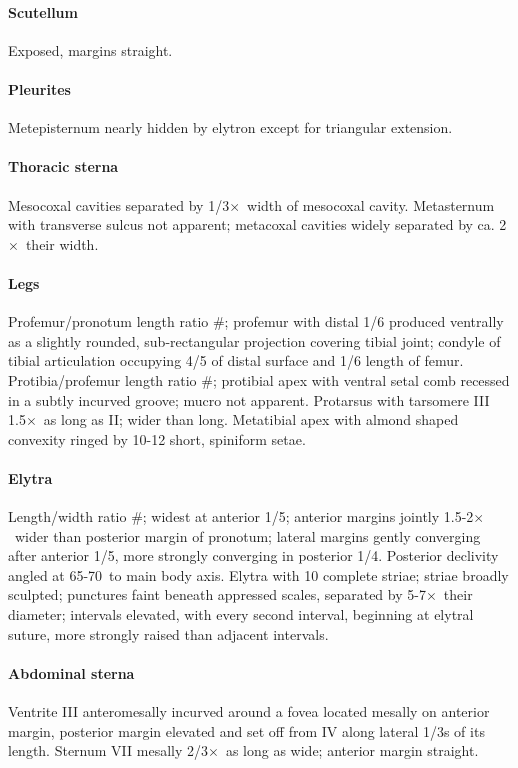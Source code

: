 \documentclass[fleqn,10pt,lineno]{wlpeerj} %
\newcommand{\td}{\textdegree~}
\newcommand{\x}{$\times$~}
\begin{document}
			\paragraph{Scutellum}
				Exposed, margins straight.
			\paragraph{Pleurites}
				Metepisternum nearly hidden by elytron except for triangular extension.
			\paragraph{Thoracic sterna} 
				Mesocoxal cavities separated by 1/3\x width of mesocoxal cavity. 
				Metasternum with transverse sulcus not apparent; metacoxal cavities widely separated by ca. 2\x their width.
			\paragraph{Legs}
				Profemur/pronotum length ratio \#; profemur with distal 1/6 produced ventrally as a slightly rounded, sub-rectangular projection covering tibial joint; condyle of tibial articulation occupying 4/5 of distal surface and 1/6 length of femur. 
				Protibia/profemur length ratio \#; protibial apex with ventral setal comb recessed in a subtly incurved groove; mucro not apparent. 
				Protarsus with tarsomere III 1.5\x as long as II; wider than long. 
				Metatibial apex with almond shaped convexity ringed by 10-12 short, spiniform setae.
			\paragraph{Elytra}
				Length/width ratio \#; widest at anterior 1/5; anterior margins jointly 1.5-2\x wider than posterior margin of pronotum; lateral margins gently converging after anterior 1/5, more strongly converging in posterior 1/4. 
				Posterior declivity angled at 65-70\td to main body axis. Elytra with 10 complete striae; striae broadly sculpted; punctures faint beneath appressed scales, separated by 5-7\x their diameter; intervals elevated, with every second interval, beginning at elytral suture, more strongly raised than adjacent intervals.
			\paragraph{Abdominal sterna}
				Ventrite III anteromesally incurved around a fovea located mesally on anterior margin, posterior margin elevated and set off from IV along lateral 1/3s of its length. 
				Sternum VII mesally 2/3\x as long as wide; anterior margin straight.
\end{document}
